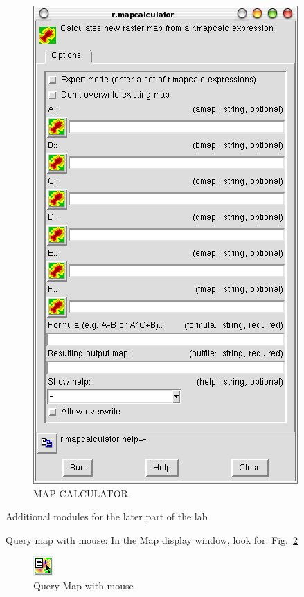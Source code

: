 \begin{figure}[htbp]
   \centering
   \includegraphics[scale=0.35]{grass016.png}
   \caption{MAP CALCULATOR}
   \label{fig:grass016}
\end{figure}

Additional modules for the later part of the lab

Query map with mouse:   
In the Map display window, look for:   Fig.~\ref{fig:grass017}

\begin{figure}[htbp]
   \centering
   \includegraphics[scale=1]{grass017.png}
   \caption{Query Map with mouse}
   \label{fig:grass017}
\end{figure}

